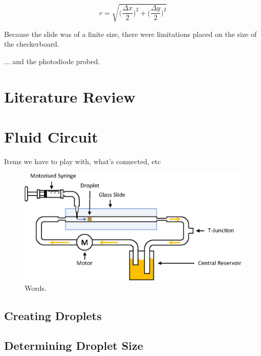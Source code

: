 \documentclass{physics_article_B}
\begin{document}
\begin{equation}
    r = \sqrt{\Big(\frac{\Delta x}{2}\Big)^2 + \Big(\frac{\Delta y}{2}\Big)^2}
\end{equation}

Because the slide was of a finite size, there were limitations placed on the size of the checkerboard.

... and the photodiode probed.

\newpage
\section{Literature Review\label{sect_litrev}}

\section{Fluid Circuit}
	
    Items we have to play with, what's connected, etc
    
    \begin{figure}[H]
	\centering
	\hspace*{-0.9cm}\includegraphics[scale=0.8]{Figures/Fluid.eps}
	\captionsetup{justification=centering}
	\caption{Words.} 	
    \label{fig:basic}
	\end{figure} 
    
	\subsection{Creating Droplets}

	\subsection{Determining Droplet Size}
\end{document}
